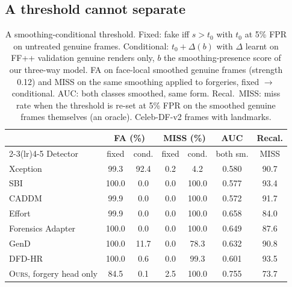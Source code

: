 \documentclass[journal]{IEEEtran}  %
\newcommand{\ours}{\textsc{Ours}}
\begin{document}
\subsection{A threshold cannot separate}
\label{sec:threshold}
\begin{table}[t]
\centering
\caption{A smoothing-conditional threshold. Fixed: fake iff $s>t_0$ with $t_0$ at 5\% FPR on untreated genuine frames.
Conditional: $t_0+\Delta(b)$ with $\Delta$ learnt on FF++ validation genuine renders only, $b$ the smoothing-presence score of
our three-way model. FA on face-local smoothed genuine frames (strength 0.12) and MISS on the same smoothing applied to
forgeries, fixed $\to$ conditional. AUC: both classes smoothed, same form. Recal.\ MISS: miss rate when the threshold is
re-set at 5\% FPR on the smoothed genuine frames themselves (an oracle). Celeb-DF-v2 frames with landmarks.}
\label{tab:bct}
\scriptsize
\setlength{\tabcolsep}{3pt}
\begin{tabular}{@{}l cc cc c c@{}}
\toprule
 & \multicolumn{2}{c}{FA (\%)} & \multicolumn{2}{c}{MISS (\%)} & AUC & Recal. \\
\cmidrule(lr){2-3}\cmidrule(lr){4-5}
Detector & fixed & cond. & fixed & cond. & both sm. & MISS \\
\midrule
Xception & 99.3 & 92.4 & 0.2 & 4.2 & 0.580 & 90.7 \\
SBI & 100.0 & 0.0 & 0.0 & 100.0 & 0.577 & 93.4 \\
CADDM & 99.9 & 0.0 & 0.0 & 100.0 & 0.572 & 91.7 \\
Effort & 99.9 & 0.0 & 0.0 & 100.0 & 0.658 & 84.0 \\
Forensics Adapter & 100.0 & 0.0 & 0.0 & 100.0 & 0.649 & 87.6 \\
GenD & 100.0 & 11.7 & 0.0 & 78.3 & 0.632 & 90.8 \\
DFD-HR & 100.0 & 0.6 & 0.0 & 99.3 & 0.601 & 93.5 \\
\ours{}, forgery head only & 84.5 & 0.1 & 2.5 & 100.0 & 0.755 & 73.7 \\
\bottomrule
\end{tabular}
\end{table}
\end{document}
